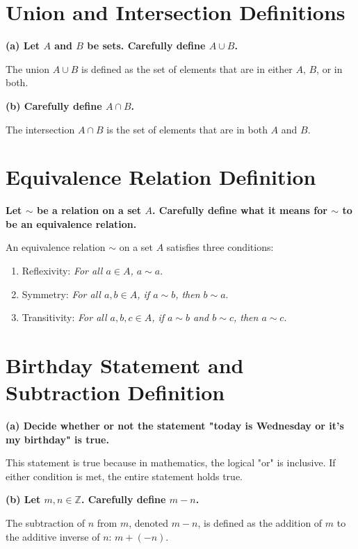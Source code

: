 \section*{Union and Intersection Definitions}

\textbf{(a) Let \( A \) and \( B \) be sets. Carefully define \( A \cup B \).}

The union \( A \cup B \) is defined as the set of elements that are in either \( A \), \( B \), or in both.

\textbf{(b) Carefully define \( A \cap B \).}

The intersection \( A \cap B \) is the set of elements that are in both \( A \) and \( B \).

\section*{Equivalence Relation Definition}

\textbf{Let \( \sim \) be a relation on a set \( A \). Carefully define what it means for \( \sim \) to be an equivalence relation.}

An equivalence relation \( \sim \) on a set \( A \) satisfies three conditions:
\begin{enumerate}
    \item Reflexivity: \textit{For all \( a \in A \), \( a \sim a \)}.
    \item Symmetry: \textit{For all \( a, b \in A \), if \( a \sim b \), then \( b \sim a \)}.
    \item Transitivity: \textit{For all \( a, b, c \in A \), if \( a \sim b \) and \( b \sim c \), then \( a \sim c \)}.
\end{enumerate}

\section*{Birthday Statement and Subtraction Definition}

\textbf{(a) Decide whether or not the statement "today is Wednesday or it's my birthday" is true.}

This statement is true because in mathematics, the logical "or" is inclusive. If either condition is met, the entire statement holds true.

\textbf{(b) Let \( m, n \in \mathbb{Z} \). Carefully define \( m - n \).}

The subtraction of \( n \) from \( m \), denoted \( m - n \), is defined as the addition of \( m \) to the additive inverse of \( n \): \( m + (-n) \).


